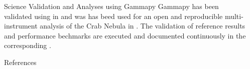 \documentclass[
    final,
    ]{beamer}
\newlength{\sepwidth}
\newlength{\colwidth}
\newcommand{\separatorcolumn}{\begin{column}{\sepwidth}\end{column}}
\newcommand{\coloredhref}[3][blue]{\href{#2}{\color{#1}{#3}}}%
\begin{document}
\begin{frame}[t, fragile]
\begin{columns}[t]
\begin{column}{\colwidth}
\begin{block}{Science Validation and Analyses using Gammapy}
Gammapy has been validated using \coloredhref[pink]{https://www.mpi-hd.mpg.de/hfm/HESS/pages/dl3-dr1/}{public H.E.S.S. data} in \cite{Mohrmann2019} and was has beed used for an open and reproducible multi-instrument analysis of the Crab Nebula in \cite{Nigro2019}. The validation of reference results and performance bechmarks are executed and documented continuously in the corresponding \coloredhref[pink]{https://github.com/gammapy/gammapy-benchmarks}{Gammapy benchmarks repository}.

  \end{block}

  \begin{block}{References}

    \nocite{*}
    \footnotesize{}

  \end{block}

\end{column}

\separatorcolumn
\end{columns}
\end{frame}
\end{document}

